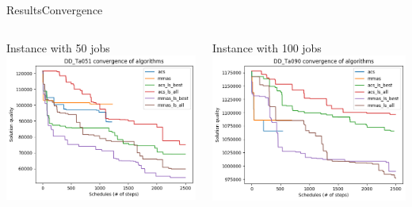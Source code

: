 \documentclass[10pt]{beamer}
\begin{document}
\begin{frame}{Results}{Convergence}
    \begin{columns}[T]
     \begin{column}{.5\textwidth}
         \begin{block}{Instance with 50 jobs}
         \includegraphics[scale=0.3]{plots/DD_Ta051__best_runs_convergence}
         \end{block}
       \end{column}
       \begin{column}{.5\textwidth}
         \begin{block}{Instance with 100 jobs}
         \includegraphics[scale=0.3]{plots/DD_Ta090__best_runs_convergence}
         \end{block}
       \end{column}
   \end{columns}
\end{frame}
\end{document}

